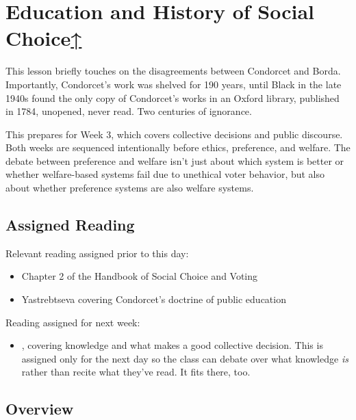 \label{cur:ed-history}
\section{Education and History of Social Choice\hyperref[syllabus]{↑}}

This lesson briefly touches on the disagreements between Condorcet and Borda.  Importantly, Condorcet's work was shelved for 190 years, until Black in the late 1940s found the only copy of Condorcet's works in an Oxford library, published in 1784, unopened, never read.  Two centuries of ignorance.

This prepares for Week 3, which covers collective decisions and public discourse.  Both weeks are sequenced intentionally before ethics, preference, and welfare.  The debate between preference and welfare isn't just about which system is better or whether welfare-based systems fail due to unethical voter behavior, but also about whether preference systems are also welfare systems.

\subsection{Assigned Reading}

Relevant reading assigned prior to this day:

\begin{itemize}
    \item Chapter 2 of the Handbook of Social Choice and Voting \autocite[15-31]{Heckelman2015}

    \item Yastrebtseva covering Condorcet's doctrine of public education \autocite{Yastrebtseva2015}
\end{itemize}

Reading assigned for next week:

\begin{itemize}
    \item {}, covering knowledge and what makes a good collective decision.  This is assigned only for the next day so the class can debate over what knowledge \textit{is} rather than recite what they've read.  It fits there, too.
\end{itemize}

\subsection{Overview}


